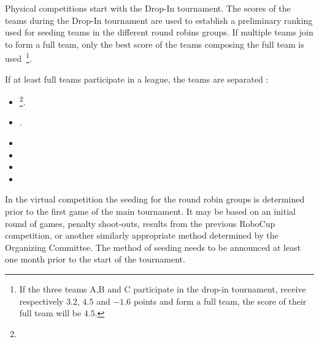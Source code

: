 \bigskip

Physical competitions start with the Drop-In tournament.
  The scores of the teams during the Drop-In tournament are used to
  establish a preliminary ranking used for seeding teams in the different round robins groups.
  If multiple teams join to form a full team,
  only the best score of the teams composing the full team is used~\footnote{%
      If the three teams A,B and C participate in the drop-in tournament,
      receive respectively $3.2$, $4.5$ and $-1.6$ points and
      form a full team,
      the score of their full team will be $4.5$.
  }.

  \bigskip

  If at least  full teams participate in a league,
  the teams are separated :
  \begin{itemize}
  \item {}
    \footnote{}.
  \item {}.
  \item {}
  \item {}
  \item {}
  \item {}
  \end{itemize}
  
\bigskip



\bigskip

  In the virtual competition the seeding for the round robin groups is determined prior to the first game of the main tournament. It may be based on an initial round of games, penalty shoot-outs, results from the previous RoboCup competition, or another similarly appropriate method determined by the Organizing Committee. The method of seeding needs to be announced at least one month prior to the start of the tournament.

